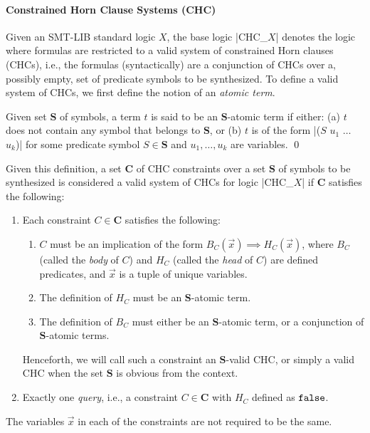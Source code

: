 \documentclass[english,a4paper,10pt]{article}
\begin{document}
\paragraph{Constrained Horn Clause Systems (CHC)}
Given an SMT-LIB standard logic $X$,
the base logic \code|CHC_$X$| denotes the logic
where formulas are restricted to a valid system of constrained Horn clauses (CHCs),
i.e., the formulas (syntactically) are a conjunction of CHCs
over a, possibly empty, set of predicate symbols to be synthesized.
To define a valid system of CHCs, we first define the notion of an \emph{atomic term}.

\begin{definition}
Given set $\mathbf{S}$ of symbols,
a term $t$ is said to be an $\mathbf{S}$-atomic term if either:
(a) $t$ does not contain any symbol that belongs to $\mathbf{S}$, or
(b) $t$ is of the form \code|($S$ $u_1$ $\ldots$ $u_k$)|
for some predicate symbol $S \in \mathbf{S}$ and $u_1, \ldots, u_k$ are variables.
\qed
\end{definition}

Given this definition, a set $\mathbf{C}$ of CHC constraints
over a set $\mathbf{S}$ of symbols to be synthesized
is considered a valid system of CHCs for logic \code|CHC_$X$|
if $\mathbf{C}$ satisfies the following:
\begin{enumerate}
  \item Each constraint $C \in \mathbf{C}$ satisfies the following:
        \begin{enumerate}
        \item $C$ must be an implication of the form $B_C(\vec x) \implies H_C(\vec x)$,
              where $B_C$ (called the \emph{body} of $C$) and $H_C$ (called the \emph{head} of $C$)
              are defined predicates, and $\vec x$ is a tuple of unique variables.

        \item The definition of $H_C$ must be an $\mathbf{S}$-atomic term.
        
        \item The definition of $B_C$ must either be an $\mathbf{S}$-atomic term,
              or a conjunction of $\mathbf{S}$-atomic terms.
        \end{enumerate}
        Henceforth, we will call such a constraint an $\mathbf{S}$-valid CHC,
        or simply a valid CHC when the set $\mathbf{S}$ is obvious from the context.

  \item Exactly one \emph{query}, i.e., a constraint $C \in \mathbf{C}$ with $H_C$ defined as $\texttt{false}$.
\end{enumerate}
The variables $\vec x$ in each of the constraints are not required to be the same.
\end{document}
